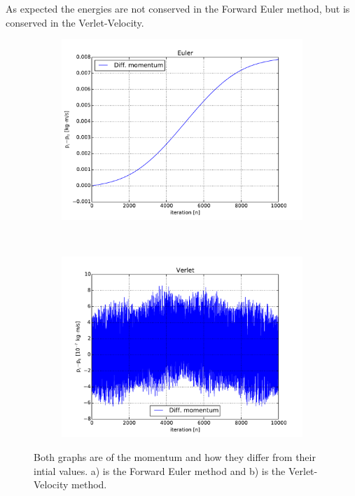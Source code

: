  As expected the energies are not conserved in the Forward Euler method, but is conserved in the Verlet-Velocity.



\begin{figure}[H]
    \centering
    \begin{subfigure}{0.5\textwidth}
        \centering
        \includegraphics[width=\linewidth]{result/bilder/momentum-euler.pdf}
    	\caption{}
    \end{subfigure}%
    ~ 
    \begin{subfigure}{0.5\textwidth}
        \centering
        \includegraphics[width=\linewidth]{result/bilder/momentum-verlet.pdf}
        \caption{}
    \end{subfigure}
    \caption{Both graphs are of the momentum and how they differ from their intial values. a) is the Forward Euler method and b) is the Verlet-Velocity method.
    }
    \label{fig:conserved-momentum}
\end{figure}


